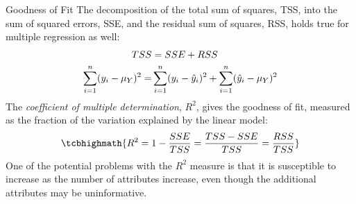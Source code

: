 %
%

\begin{frame}{Goodness of Fit}
The decomposition of the total sum of squares, TSS, into the sum of
squared errors, SSE, and the residual sum of squares, RSS, holds true
for multiple regression as well:
\begin{align*}
    TSS & = SSE + RSS\\
    \sum^{n}_{i=1} (y_i - \mu_Y)^2 = &
    \sum^{n}_{i=1} (y_i - \hat{y}_i)^2 +
    \sum^{n}_{i=1} (\hat{y}_i - \mu_Y)^2
\end{align*}
%
The {\em coefficient of multiple determination}, $R^2$, gives the goodness of fit,
measured as the fraction of the variation explained by the linear model:
\begin{align*}
    \tcbhighmath{
    R^2 = 1 - \frac{SSE}{TSS} = \frac{TSS-SSE}{TSS} =
\frac{RSS}{TSS}}
\end{align*}
%
One of the potential problems with the $R^2$ measure is that it is
susceptible to increase as the number of attributes increase, even
though the additional attributes may be uninformative. 

\end{frame}

